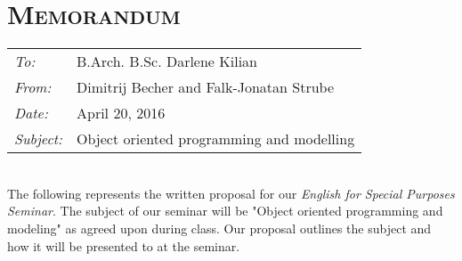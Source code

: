 
\renewcommand{\workingdir}{../../}



\DNotiz{}
\renewcommand{\Dokumentensignatur}{}




\chapter*{\textsc{Memorandum}}
\begin{tabular}{l l}
\emph{To:} & B.Arch. B.Sc. Darlene Kilian\\
\emph{From:} & Dimitrij Becher and Falk-Jonatan Strube\\
\emph{Date:} & April 20, 2016\\
\emph{Subject:} & Object oriented programming and modelling\\
\end{tabular}\medskip\\
The following represents the written proposal for our \emph{English for Special Purposes Seminar}. The subject of our seminar will be "Object oriented programming and modeling" as agreed upon during class. Our proposal outlines the subject and how it will be presented to at the seminar. 

